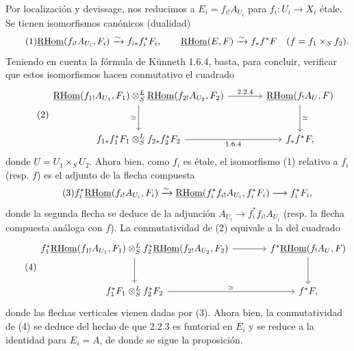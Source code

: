 Por localización y devissage, nos reducimos a $E_i=f_{i!}A_{U_i}$ para $f_i:U_i\to X_i$ étale. Se tienen isomorfismos canónicos (dualidad)
\begin{equation}\tag{1}
\underline{\mathrm{RHom}}(f_{i!}A_{U_i},F_i)\xrightarrow{\sim}f_{i*}f_i^{*}F_i,
\qquad
\underline{\mathrm{RHom}}(E,F)\xrightarrow{\sim}f_{*}f^{*}F\quad(f=f_1\times_S f_2).
\end{equation}
Teniendo en cuenta la fórmula de Künneth 1.6.4, basta, para concluir, verificar que estos isomorfismos hacen conmutativo el cuadrado
\begin{equation}\tag{2}
\begin{tikzcd}[column sep=large,row sep=large]
\uRHom(f_{1!}A_{U_1},F_1)\otimes^{L}_{S}\uRHom(f_{2!}A_{U_2},F_2) \arrow[r,"2.2.4"] \arrow[d,"\simeq"'] & \uRHom(f_{!}A_U,F) \arrow[d,"\simeq"]\\
f_{1*}f_1^{*}F_1\otimes^{L}_{S}f_{2*}f_2^{*}F_2 \arrow[r,"1.6.4"'] & f_{*}f^{*}F,
\end{tikzcd}
\end{equation}
donde $U=U_1\times_S U_2$. Ahora bien, como $f_i$ es étale, el isomorfismo (1) relativo a $f_i$ (resp. $f$) es el adjunto de la flecha compuesta
\begin{equation}\tag{3}
f_i^{*}\underline{\mathrm{RHom}}(f_{i!}A_{U_i},F_i)\xrightarrow{\sim}\underline{\mathrm{RHom}}(f_i^{*}f_{i!}A_{U_i},f_i^{*}F_i)\longrightarrow f_i^{*}F_i,
\end{equation}
donde la segunda flecha se deduce de la adjunción $A_{U_i}\to f_i^{*}f_{i!}A_{U_i}$ (resp. la flecha compuesta análoga con $f$). La conmutatividad de (2) equivale a la del cuadrado
\begin{equation}\tag{4}
\begin{tikzcd}[column sep=large,row sep=large]
f_1^{*}\uRHom(f_{1!}A_{U_1},F_1)\otimes^{L}_{S}f_2^{*}\uRHom(f_{2!}A_{U_2},F_2) \arrow[r] \arrow[d] & f^{*}\uRHom(f_{!}A_U,F) \arrow[d]\\
f_1^{*}F_1\otimes^{L}_{S}f_2^{*}F_2 \arrow[r,"\simeq"] & f^{*}F,
\end{tikzcd}
\end{equation}
donde las flechas verticales vienen dadas por (3). Ahora bien, la conmutatividad de (4) se deduce del hecho de que 2.2.3 es funtorial en $E_i$ y se reduce a la identidad para $E_i=A$, de donde se sigue la proposición.

